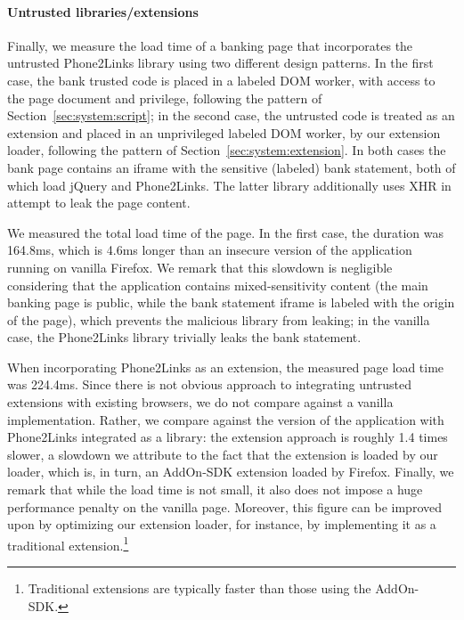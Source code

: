 \paragraph{Untrusted libraries/extensions}

Finally, we measure the load time of a banking page that incorporates
the untrusted Phone2Links library using two different design patterns.
%
In the first case, the bank trusted code is placed in a labeled DOM
worker, with access to the page document and privilege, following the
pattern of Section~\ref{sec:system:script}; in the second case, the
untrusted code is treated as an extension and placed in an
unprivileged labeled DOM worker, by our extension loader, following
the pattern of Section~\ref{sec:system:extension}.
%
In both cases the bank page contains an iframe with the sensitive
(labeled) bank statement, both of which load jQuery and
Phone2Links.
%
The latter library additionally uses XHR in attempt to leak the page
content.

We measured the total load time of the page. In the first case, the
duration was 164.8ms, which is 4.6ms longer than an insecure version
of the application running on vanilla Firefox.
%
We remark that this slowdown is negligible considering that
the application contains mixed-sensitivity content (the main banking
page is public, while the bank statement iframe is labeled with the
origin of the page), which \sys{} prevents the malicious library from
leaking; in the vanilla case, the Phone2Links library trivially leaks
the bank statement.

When incorporating Phone2Links as an extension, the measured page load
time was 224.4ms.
%
Since there is not obvious approach to integrating untrusted
extensions with existing browsers, we do not compare against a vanilla
implementation.
%
Rather, we compare against the version of the application with
Phone2Links integrated as a library: the extension approach is
roughly 1.4 times slower, a slowdown we attribute to the fact that the
extension is loaded by our loader, which is, in turn, an AddOn-SDK
extension loaded by Firefox.
%
Finally, we remark that while the load time is not small, it also does
not impose a huge performance penalty on the vanilla page.
%
Moreover, this figure can be improved upon by optimizing our
extension loader, for instance, by implementing it as a traditional
extension.\footnote{
  Traditional extensions are typically faster than those using the
  AddOn-SDK.
}




